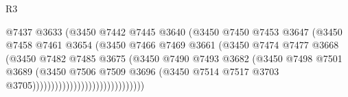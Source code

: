 \begin{lexlean}{R3}
\begin{coremodule}
                                            @7437
                                            @3633
                                            (@3450
                                              @7442
                                              @7445
                                              @3640
                                              (@3450
                                                @7450
                                                @7453
                                                @3647
                                                (@3450
                                                  @7458
                                                  @7461
                                                  @3654
                                                  (@3450
                                                    @7466
                                                    @7469
                                                    @3661
                                                    (@3450
                                                      @7474
                                                      @7477
                                                      @3668
                                                      (@3450
                                                        @7482
                                                        @7485
                                                        @3675
                                                        (@3450
                                                          @7490
                                                          @7493
                                                          @3682
                                                          (@3450
                                                            @7498
                                                            @7501
                                                            @3689
                                                            (@3450
                                                              @7506
                                                              @7509
                                                              @3696
                                                              (@3450
                                                                @7514
                                                                @7517
                                                                @3703
                                                                @3705))))))))))))))))))))))))))))))

\end{coremodule}
\end{lexlean}
